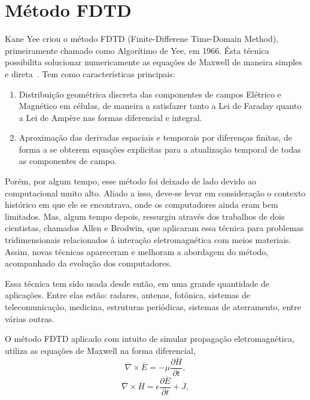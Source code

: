 \section{Método FDTD}
	Kane Yee criou o método FDTD (Finite-Differene Time-Domain Method), primeiramente chamado como Algorítimo de Yee, em 1966. Ésta técnica possibilita solucionar numericamente as equações de Maxwell de maneira simples e direta~\cite{rodrigo}. Tem como características principais: 
\begin{enumerate}
\item Distribuição geométrica discreta das componentes de campos Elétrico e Magnético em células, de maneira a satisfazer tanto a Lei de Faraday quanto a Lei de Ampère nas formas diferencial e integral.
\item Aproximação das derivadas espaciais e temporais por diferenças finitas, de forma a se obterem equações explicitas para a atualização temporal de todas as componentes de campo.
\end{enumerate}

	Porém, por algum tempo, esse método foi deixado de lado devido ao computacional muito alto. Aliado a isso, deve-se levar em consideração o contexto histórico em que ele se encontrava, onde os computadores ainda eram bem limitados. Mas, algum tempo depois, ressurgiu através dos trabalhos de dois cientistas, chamados Allen e Brodwin, que aplicaram essa técnica para problemas tridimensionais relacionados à interação eletromagnética com meios materiais\cite{allen}. Assim, novas técnicas apareceram e melhoram a abordagem do método, acompanhado da evolução dos computadores.

	Essa técnica tem sido usada desde então, em uma grande quantidade de aplicações. Entre elas estão: radares, antenas, fotônica, sistemas de telecomunicação, medicina, estruturas periódicas, sistemas de aterramento, entre várias outras\cite{taflove}.

	O método FDTD aplicado com intuito de simular propagação eletromagnética, utiliza as equações de Maxwell na forma diferencial,
\begin{equation}\label{eq:faraday}
	\overline{\nabla}\times\overline{E}=-\mu\frac{\partial \overline{H}}{\partial t},
\end{equation}
\begin{equation}\label{eq:ampere}
		\overline{\nabla}\times\overline{H}=\epsilon\frac{\partial \overline{E}}{\partial t} + \overline{J},
\end{equation}

